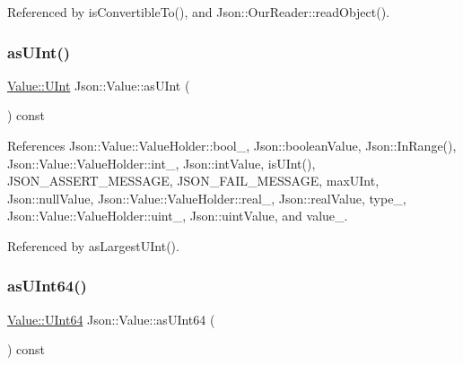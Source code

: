 Referenced by is\+Convertible\+To(), and Json\+::\+Our\+Reader\+::read\+Object().

\mbox{\label{classJson_1_1Value_a74b305583ec3aacf4f9dd06e799dc265_a74b305583ec3aacf4f9dd06e799dc265}} 
\subsubsection{\texorpdfstring{as\+U\+Int()}{asUInt()}}
{\footnotesize\ttfamily \hyperlink{classJson_1_1Value_a0933d59b45793ae4aade1757c322a98d_a0933d59b45793ae4aade1757c322a98d}{Value\+::\+U\+Int} Json\+::\+Value\+::as\+U\+Int (\begin{DoxyParamCaption}{ }\end{DoxyParamCaption}) const}



References Json\+::\+Value\+::\+Value\+Holder\+::bool\+\_\+, Json\+::boolean\+Value, Json\+::\+In\+Range(), Json\+::\+Value\+::\+Value\+Holder\+::int\+\_\+, Json\+::int\+Value, is\+U\+Int(), J\+S\+O\+N\+\_\+\+A\+S\+S\+E\+R\+T\+\_\+\+M\+E\+S\+S\+A\+GE, J\+S\+O\+N\+\_\+\+F\+A\+I\+L\+\_\+\+M\+E\+S\+S\+A\+GE, max\+U\+Int, Json\+::null\+Value, Json\+::\+Value\+::\+Value\+Holder\+::real\+\_\+, Json\+::real\+Value, type\+\_\+, Json\+::\+Value\+::\+Value\+Holder\+::uint\+\_\+, Json\+::uint\+Value, and value\+\_\+.



Referenced by as\+Largest\+U\+Int().

\mbox{\label{classJson_1_1Value_a0e44a5a4cd0c099f9570dfa25813eb60_a0e44a5a4cd0c099f9570dfa25813eb60}} 
\subsubsection{\texorpdfstring{as\+U\+Int64()}{asUInt64()}}
{\footnotesize\ttfamily \hyperlink{classJson_1_1Value_a8b62564be8c087c6d18de180ff4e13e3_a8b62564be8c087c6d18de180ff4e13e3}{Value\+::\+U\+Int64} Json\+::\+Value\+::as\+U\+Int64 (\begin{DoxyParamCaption}{ }\end{DoxyParamCaption}) const}



